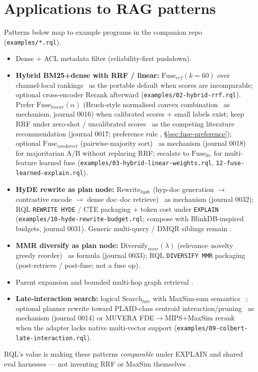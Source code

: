 \section{Applications to RAG patterns}
\label{sec:apps}

Patterns below map to example programs in the companion repo (\texttt{examples/*.rql}).

\begin{itemize}
  \item Dense + ACL metadata filter (reliability-first pushdown).
  \item \textbf{Hybrid BM25+dense with RRF / linear:}
    \(\mathrm{Fuse}_{rrf}(k{=}60)\) over channel-local rankings~\citep{cormack2009rrf} \established{} as the portable default when scores are incomparable;
    optional cross-encoder \(\mathrm{Rerank}\) afterward (\texttt{examples/02-hybrid-rrf.rql}).
    Prefer \(\mathrm{Fuse}_{linear}(\alpha)\) (Bruch-style normalised convex combination~\citep{bruch2023fusion} \established{} as mechanism, journal 0016) when calibrated scores + small labels exist;
    keep RRF under zero-shot / uncalibrated scores~\citep{chen2022ood} \established{} as the competing literature recommendation (journal 0017; preference rule \hypothesis{}, \S\ref{sec:fuse-preference});
    optional \(\mathrm{Fuse}_{condorcet}\) (pairwise-majority sort)~\citep{montague2002condorcet} \established{} as mechanism (journal 0018) for majoritarian A/B without replacing RRF;
    escalate to \(\mathrm{Fuse}_{ltr}\) for multi-feature learned fuse \hypothesis{}
    (\texttt{examples/03-hybrid-linear-weights.rql}, \texttt{12-fuse-learned-explain.rql}).
  \item \textbf{HyDE rewrite as plan node:}
    $\mathrm{Rewrite}_{hyde}$ (hyp-doc generation $\rightarrow$ contrastive encode $\rightarrow$ dense doc--doc retrieve)~\citep{gao2023hyde} \established{} as mechanism (journal 0032);
    RQL \texttt{REWRITE HYDE} / CTE packaging + token cost under \texttt{EXPLAIN} \hypothesis{}
    (\texttt{examples/10-hyde-rewrite-budget.rql}; compose with BlinkDB-inspired budgets, journal 0031).
    Generic multi-query / DMQR siblings remain \provisional{}.
  \item \textbf{MMR diversify as plan node:}
    $\mathrm{Diversify}_{mmr}(\lambda)$ (relevance--novelty greedy reorder)~\citep{carbonell1998mmr} \established{} as formula (journal 0033);
    RQL \texttt{DIVERSIFY MMR} packaging \hypothesis{} (post-retrieve / post-fuse; not a fuse op).
  \item Parent expansion and bounded multi-hop graph retrieval \provisional{}.
  \item \textbf{Late-interaction search:}
    logical \(\mathrm{Search}_{late}\) with MaxSim-sum semantics~\citep{khattab2020colbert} \established{};
    optional planner rewrite toward PLAID-class centroid interaction/pruning~\citep{santhanam2022plaid} \established{} as mechanism (journal 0014) or MUVERA FDE$\rightarrow$MIPS$+$MaxSim rerank~\citep{jayaram2024muvera} when the adapter lacks native multi-vector support \hypothesis{}
    (\texttt{examples/09-colbert-late-interaction.rql}).
\end{itemize}

RQL's value is making these patterns \emph{comparable} under EXPLAIN and shared eval harnesses \hypothesis{} --- not inventing RRF or MaxSim themselves \established{}.
